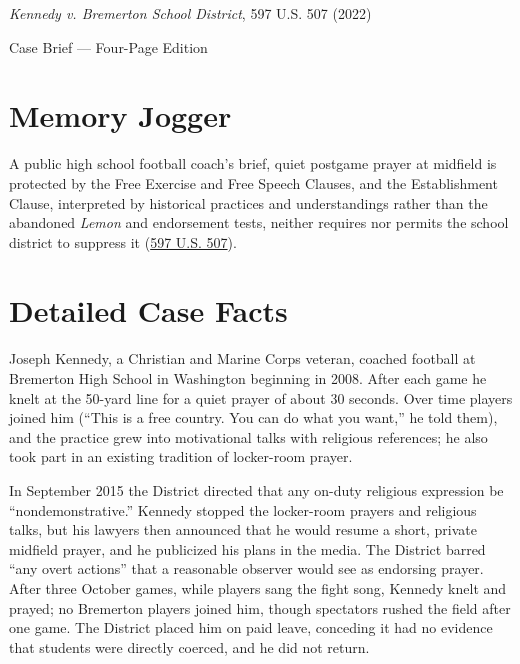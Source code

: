 \documentclass[12pt]{article}
\begin{document}
\begin{center}
{\LARGE \textit{Kennedy v. Bremerton School District}, 597 U.S. 507 (2022)\par}
\vspace{0.8em}
{\large Case Brief --- Four-Page Edition\par}
\end{center}
\vspace{1em}

\section{Memory Jogger}

A public high school football coach's brief, quiet postgame prayer at midfield is protected by the Free Exercise and Free Speech Clauses, and the Establishment Clause, interpreted by historical practices and understandings rather than the abandoned \textit{Lemon} and endorsement tests, neither requires nor permits the school district to suppress it (\href{https://www.law.cornell.edu/supremecourt/text/21-418}{597 U.S. 507}).

\section{Detailed Case Facts}

Joseph Kennedy, a Christian and Marine Corps veteran, coached football at Bremerton High School in Washington beginning in 2008. After each game he knelt at the 50-yard line for a quiet prayer of about 30 seconds. Over time players joined him (``This is a free country. You can do what you want,'' he told them), and the practice grew into motivational talks with religious references; he also took part in an existing tradition of locker-room prayer.

In September 2015 the District directed that any on-duty religious expression be ``nondemonstrative.'' Kennedy stopped the locker-room prayers and religious talks, but his lawyers then announced that he would resume a short, private midfield prayer, and he publicized his plans in the media. The District barred ``any overt actions'' that a reasonable observer would see as endorsing prayer. After three October games, while players sang the fight song, Kennedy knelt and prayed; no Bremerton players joined him, though spectators rushed the field after one game. The District placed him on paid leave, conceding it had no evidence that students were directly coerced, and he did not return.
\end{document}
